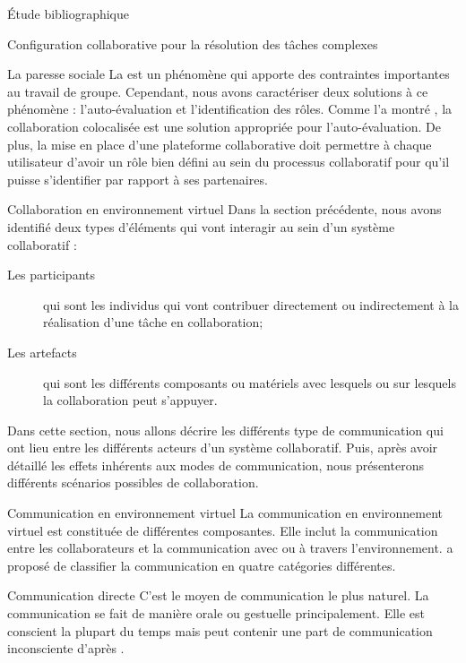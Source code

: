 \documentclass[myfrancais,ngerman,english,french]{mythesis}
\begin{document}
\begin{mychapter}{Étude bibliographique}
\begin{mysection}{Configuration collaborative pour la résolution des tâches complexes}
\begin{mysubsection}{La paresse sociale}
				La  est un phénomène qui apporte des contraintes importantes au travail de groupe.
				Cependant, nous avons caractériser deux solutions à ce phénomène : l'auto-évaluation et l'identification des rôles.
				Comme l'a montré , la collaboration colocalisée est une solution appropriée pour l'auto-évaluation.
				De plus, la mise en place d'une plateforme collaborative doit permettre à chaque utilisateur d'avoir un rôle bien défini au sein du processus collaboratif pour qu'il puisse s'identifier par rapport à ses partenaires.
			\end{mysubsection}
		\end{mysection}
		\begin{mysection}{Collaboration en environnement virtuel}
			Dans la section précédente, nous avons identifié deux types d'éléments qui vont interagir au sein d'un système collaboratif :
			\begin{description}
				\item[Les participants] qui sont les individus qui vont contribuer directement ou indirectement à la réalisation d'une tâche en collaboration;
				\item[Les artefacts] qui sont les différents composants ou matériels avec lesquels ou sur lesquels la collaboration peut s'appuyer.
			\end{description}
			Dans cette section, nous allons décrire les différents type de communication qui ont lieu entre les différents acteurs d'un système collaboratif.
			Puis, après avoir détaillé les effets inhérents aux modes de communication, nous présenterons différents scénarios possibles de collaboration.
			\begin{mysubsection}{Communication en environnement virtuel}
				La communication en environnement virtuel est constituée de différentes composantes.
				Elle inclut la communication entre les collaborateurs et la communication avec ou à travers l'environnement.
				 a proposé de classifier la communication en quatre catégories différentes.
				\begin{mysubsubsection}{Communication directe}
					C'est le moyen de communication le plus naturel.
					La communication se fait de manière orale ou gestuelle principalement.
					Elle est conscient la plupart du temps mais peut contenir une part de communication inconsciente d'après .

\end{mysubsubsection}
\end{mysubsection}
\end{mysection}
\end{mychapter}
\end{document}

